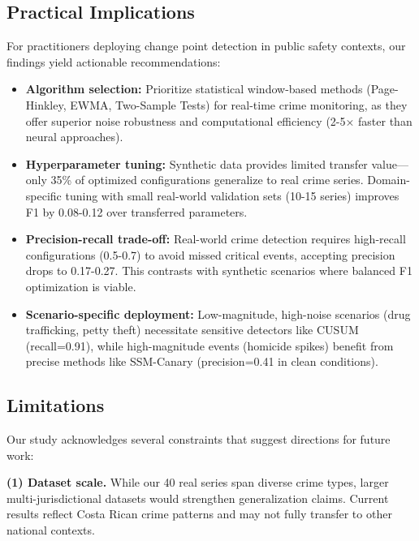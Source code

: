\subsection{Practical Implications}

For practitioners deploying change point detection in public safety contexts, our findings yield actionable recommendations:

\begin{itemize}
    \item \textbf{Algorithm selection:} Prioritize statistical window-based methods (Page-Hinkley, EWMA, Two-Sample Tests) for real-time crime monitoring, as they offer superior noise robustness and computational efficiency (2-5× faster than neural approaches).
    
    \item \textbf{Hyperparameter tuning:} Synthetic data provides limited transfer value—only 35\% of optimized configurations generalize to real crime series. Domain-specific tuning with small real-world validation sets (10-15 series) improves F1 by 0.08-0.12 over transferred parameters.
    
    \item \textbf{Precision-recall trade-off:} Real-world crime detection requires high-recall configurations (0.5-0.7) to avoid missed critical events, accepting precision drops to 0.17-0.27. This contrasts with synthetic scenarios where balanced F1 optimization is viable.
    
    \item \textbf{Scenario-specific deployment:} Low-magnitude, high-noise scenarios (drug trafficking, petty theft) necessitate sensitive detectors like CUSUM (recall=0.91), while high-magnitude events (homicide spikes) benefit from precise methods like SSM-Canary (precision=0.41 in clean conditions).
\end{itemize}


\subsection{Limitations}

Our study acknowledges several constraints that suggest directions for future work:

\textbf{(1) Dataset scale.} While our 40 real series span diverse crime types, larger multi-jurisdictional datasets would strengthen generalization claims. Current results reflect Costa Rican crime patterns and may not fully transfer to other national contexts.

